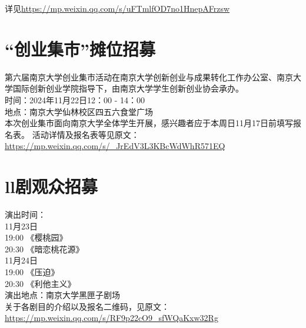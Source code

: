 \documentclass[letterpaper, 12pt]{article}
\begin{document}
\begin{multicols}{2}
详见\url{https://mp.weixin.qq.com/s/uFTmlfOD7no1HnepAFrzsw}
\section{“创业集市”摊位招募}
第六届南京大学创业集市活动在南京大学创新创业与成果转化工作办公室、南京大学国际创新创业学院指导下，由南京大学学生创新创业协会承办。\\
时间：2024年11月22日12：00 - 14：00\\
地点：南京大学仙林校区四五六食堂广场\\
本次创业集市面向南京大学全体学生开展，感兴趣者应于本周日11月17日前填写报名表。
活动详情及报名表等见原文：\url{https://mp.weixin.qq.com/s/_JrEdV3L3KBcWdWhR571EQ}

\section{ll剧观众招募}
演出时间：\\
11月23日\\
19:00 《樱桃园》\\
20:30 《暗恋桃花源》\\
11月24日\\
19:00 《压迫》\\
20:30 《利他主义》\\
演出地点：南京大学黑匣子剧场\\
关于各剧目的介绍以及报名二维码，见原文：\url{https://mp.weixin.qq.com/s/RF9p22cO9_sfWQaKxw32Rg}

\end{multicols} 
\end{document}

